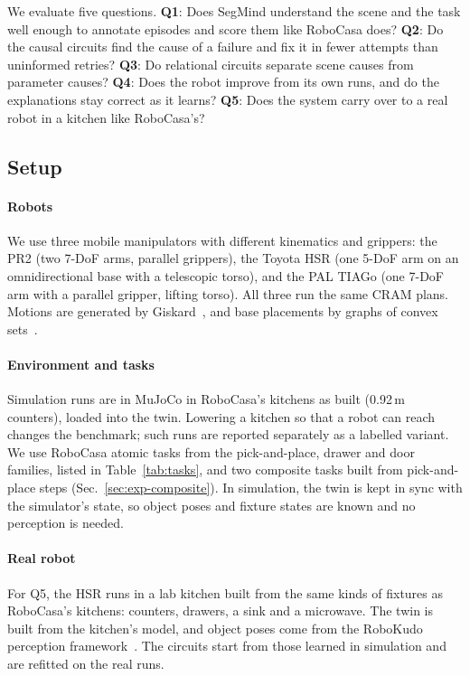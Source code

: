 \documentclass[letterpaper, 10 pt, conference]{ieeeconf}
\newcommand{\robocasa}{RoboCasa}
\newcommand{\segmind}{SegMind}
\begin{document}
We evaluate five questions.
\textbf{Q1}: Does \segmind{} understand the scene and the task well enough to
annotate episodes and score them like \robocasa{} does?
\textbf{Q2}: Do the causal circuits find the cause of a failure and fix it in
fewer attempts than uninformed retries?
\textbf{Q3}: Do relational circuits separate scene causes from parameter causes?
\textbf{Q4}: Does the robot improve from its own runs, and do the explanations
stay correct as it learns?
\textbf{Q5}: Does the system carry over to a real robot in a kitchen like
\robocasa{}'s?

\subsection{Setup}
\label{sec:setup}

\paragraph*{Robots}
We use three mobile manipulators with different kinematics and grippers: the
PR2 (two 7-DoF arms, parallel grippers), the Toyota HSR (one 5-DoF arm on an
omnidirectional base with a telescopic torso), and the PAL TIAGo (one 7-DoF arm
with a parallel gripper, lifting torso). All three run the same CRAM plans. Motions are
generated by Giskard~\cite{stelter2025motionstatecharts}, and base placements
by graphs of convex sets~\cite{marcucci2023gcs}.

\paragraph*{Environment and tasks}
Simulation runs are in MuJoCo in \robocasa{}'s kitchens as built (0.92\,m
counters), loaded into the twin. Lowering a kitchen so that a robot can reach
changes the benchmark; such runs are reported separately as a labelled variant.
We use \robocasa{} atomic tasks from the pick-and-place, drawer and door
families, listed in Table~\ref{tab:tasks}, and two composite tasks built from
pick-and-place steps (Sec.~\ref{sec:exp-composite}). In simulation, the twin is
kept in sync with the simulator's state, so object poses and fixture states are
known and no perception is needed.

\paragraph*{Real robot}
For Q5, the HSR runs in a lab kitchen built from the same kinds of fixtures as
\robocasa{}'s kitchens: counters, drawers, a sink and a microwave. The twin is
built from the kitchen's model, and object poses come from the RoboKudo
perception framework~\cite{mania2024robokudo}. The circuits start from those
learned in simulation and are refitted on the real runs.
\end{document}
